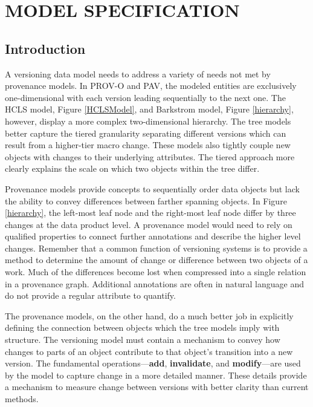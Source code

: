 
\chapter{MODEL SPECIFICATION}\label{ch:model}

\section{Introduction}

A versioning data model needs to address a variety of needs not met by provenance models.
In PROV-O and PAV, the modeled entities are exclusively one-dimensional with each version leading sequentially to the next one.
The HCLS model, Figure \ref{HCLSModel}, and Barkstrom model, Figure \ref{hierarchy}, however, display a more complex two-dimensional hierarchy.
The tree models better capture the tiered granularity separating different versions which can result from a higher-tier macro change.
These models also tightly couple new objects with changes to their underlying attributes.
The tiered approach more clearly explains the scale on which two objects within the tree differ.

Provenance models provide concepts to sequentially order data objects but lack the ability to convey differences between farther spanning objects.
In Figure \ref{hierarchy}, the left-most leaf node and the right-most leaf node differ by three changes at the data product level.
A provenance model would need to rely on qualified properties to connect further annotations and describe the higher level changes.
Remember that a common function of versioning systems is to provide a method to determine the amount of change or difference between two objects of a work.
Much of the differences become lost when compressed into a single relation in a provenance graph.
Additional annotations are often in natural language and do not provide a regular attribute to quantify.

The provenance models, on the other hand, do a much better job in explicitly defining the connection between objects which the tree models imply with structure.
The versioning model must contain a mechanism to convey how changes to parts of an object contribute to that object's transition into a new version.
The fundamental operations---\textbf{add}, \textbf{invalidate}, and \textbf{modify}---are used by the model to capture change in a more detailed manner.
These details provide a mechanism to measure change between versions with better clarity than current methods.

